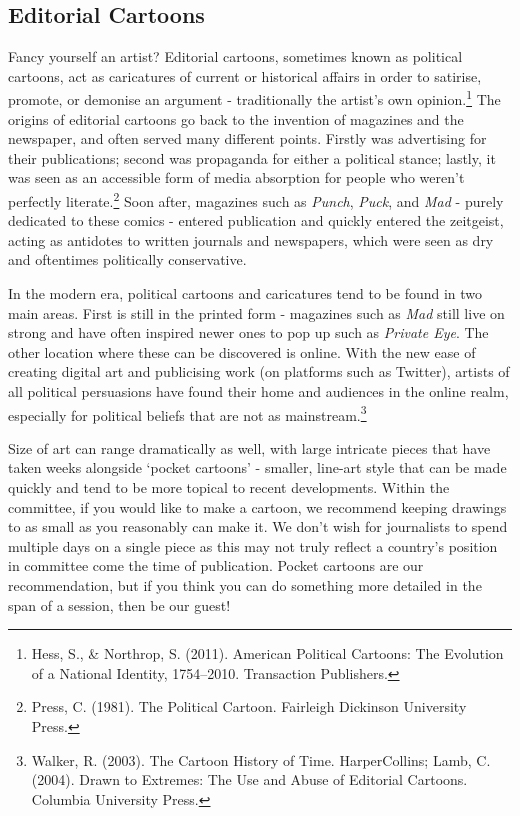 \subsection{Editorial Cartoons}

Fancy yourself an artist? Editorial cartoons, sometimes known as political cartoons, act as caricatures of current or historical affairs in order to satirise, promote, or demonise an argument - traditionally the artist’s own opinion.\footnote{Hess, S., \& Northrop, S. (2011). American Political Cartoons: The Evolution of a National Identity, 1754–2010. Transaction Publishers.} The origins of editorial cartoons go back to the invention of magazines and the newspaper, and often served many different points. Firstly was advertising for their publications; second was propaganda for either a political stance; lastly, it was seen as an accessible form of media absorption for people who weren’t perfectly literate.\footnote{Press, C. (1981). The Political Cartoon. Fairleigh Dickinson University Press.} Soon after, magazines such as \emph{Punch}, \emph{Puck}, and \emph{Mad} - purely dedicated to these comics - entered publication and quickly entered the zeitgeist, acting as antidotes to written journals and newspapers, which were seen as dry and oftentimes politically conservative.

In the modern era, political cartoons and caricatures tend to be found in two main areas. First is still in the printed form - magazines such as \emph{Mad} still live on strong and have often inspired newer ones to pop up such as \emph{Private Eye}. The other location where these can be discovered is online. With the new ease of creating digital art and publicising work (on platforms such as Twitter), artists of all political persuasions have found their home and audiences in the online realm, especially for political beliefs that are not as mainstream.\footnote{Walker, R. (2003). The Cartoon History of Time. HarperCollins; Lamb, C. (2004). Drawn to Extremes: The Use and Abuse of Editorial Cartoons. Columbia University Press.}

Size of art can range dramatically as well, with large intricate pieces that have taken weeks alongside ‘pocket cartoons’ - smaller, line-art style that can be made quickly and tend to be more topical to recent developments. Within the committee, if you would like to make a cartoon, we recommend keeping drawings to as small as you reasonably can make it. We don’t wish for journalists to spend multiple days on a single piece as this may not truly reflect a country’s position in committee come the time of publication. Pocket cartoons are our recommendation, but if you think you can do something more detailed in the span of a session, then be our guest!

